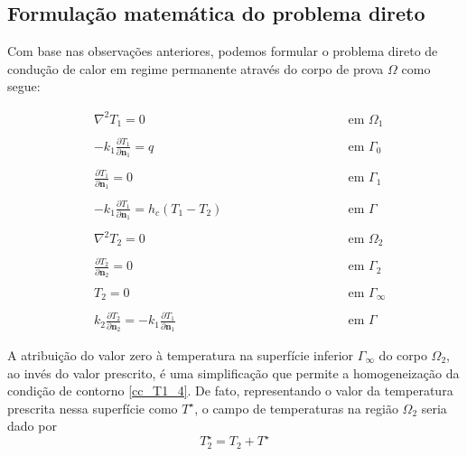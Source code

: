 \subsection{Formulação matemática do problema direto}\label{sec_formulacao_direta}
Com base nas observações anteriores, podemos formular o problema direto de condução de calor em regime permanente através do corpo de prova $\Omega$ como segue: 

\begin{subequations}
\begin{alignat}{2}
	& \nabla^2 T_1 = 0 \quad\quad\quad\quad\quad && \text{ em } \Omega_1 \label{harm_T1} \\ \nonumber \\
	& -k_1 \frac{\partial T_1}{\partial\mathbf{n}_1} = q && \text{ em } \Gamma_0  \label{cc_T1_2} \\ \nonumber \\
	& \frac{\partial T_1}{\partial \mathbf{n}_1} = 0 && \text{ em }  \Gamma_1 \label{cc_T1_1} \\ \nonumber \\
	& -k_1 \frac{\partial T_1}{\partial\mathbf{n}_1} = h_c(T_1-T_2) \quad\quad\quad\quad\quad\quad\quad\quad && \text{ em }  \Gamma \label{cc_grad_T1} \\ \nonumber \\
	& \nabla^2 T_2 = 0 && \text{ em }  \Omega_2 \label{harm_T2} \\ \nonumber \\
	& \frac{\partial T_2}{\partial \mathbf{n}_2} = 0 && \text{ em }  \Gamma_2 \label{cc_T1_3} \\ \nonumber \\
	& T_2 = 0 && \text{ em }  \Gamma_\infty \label{cc_T1_4} \\ \nonumber \\
	& k_2\frac{\partial T_2}{\partial\mathbf{n}_2} = - k_1\frac{\partial T_1}{\partial\mathbf{n}_1} && \text{ em }  \Gamma \label{cc_T1_5}
\end{alignat}
\end{subequations}

A atribuição do valor zero à temperatura na superfície inferior $\Gamma_\infty$ do corpo $\Omega_2$, ao invés do valor prescrito, é uma simplificação
que permite a homogeneização da condição de contorno \eqref{cc_T1_4}. De fato, representando o valor da temperatura prescrita nessa superfície como $T^\star$,
o campo de temperaturas na região $\Omega_2$ seria dado por
\begin{equation}
	T_2^\star = T_2 + T^\star
\end{equation}
